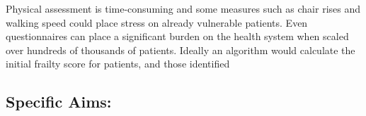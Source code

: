 Physical assessment is time-consuming and some measures such as chair rises and walking speed \cite{10811152} could place stress on already vulnerable patients. Even questionnaires can place a significant burden on the health system when scaled over hundreds of thousands of patients. Ideally an algorithm would calculate the initial frailty score for patients, and those identified 

\subsection{Specific Aims:}\label{specific-aims}
